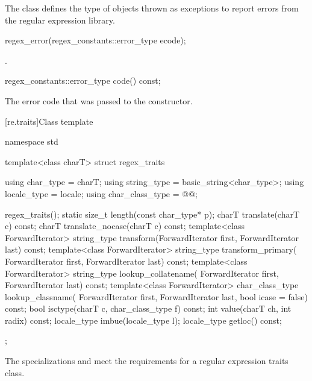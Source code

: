 \pnum
The class  defines the type of objects thrown as
exceptions to report errors from the regular expression library.

%
\begin{itemdecl}
regex_error(regex_constants::error_type ecode);
\end{itemdecl}

\begin{itemdescr}
\pnum
\ensures
{}.
\end{itemdescr}

%
%
\begin{itemdecl}
regex_constants::error_type code() const;
\end{itemdecl}

\begin{itemdescr}
\pnum
\returns
The error code that was passed to the constructor.
\end{itemdescr}

[re.traits]{Class template }
%
\begin{codeblock}
namespace std {
  template<class charT>
    struct regex_traits {
      using char_type       = charT;
      using string_type     = basic_string<char_type>;
      using locale_type     = locale;
      using char_class_type = @@;

      regex_traits();
      static size_t length(const char_type* p);
      charT translate(charT c) const;
      charT translate_nocase(charT c) const;
      template<class ForwardIterator>
        string_type transform(ForwardIterator first, ForwardIterator last) const;
      template<class ForwardIterator>
        string_type transform_primary(
          ForwardIterator first, ForwardIterator last) const;
      template<class ForwardIterator>
        string_type lookup_collatename(
          ForwardIterator first, ForwardIterator last) const;
      template<class ForwardIterator>
        char_class_type lookup_classname(
          ForwardIterator first, ForwardIterator last, bool icase = false) const;
      bool isctype(charT c, char_class_type f) const;
      int value(charT ch, int radix) const;
      locale_type imbue(locale_type l);
      locale_type getloc() const;
    };
}
\end{codeblock}

\pnum
{}%
%
The specializations  and
 meet the
requirements for a regular expression traits class.

